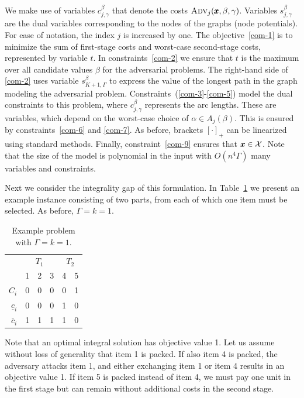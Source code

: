 We make use of variables $c^\beta_{j,\gamma}$ that denote the costs $\textsc{Adv}_j(\pmb{x},\beta,\gamma)$. Variables $s^\beta_{j,\gamma}$ are the dual variables corresponding to the nodes of the graphs (node potentials). For ease of notation, the index $j$ is increased by one.
The objective~\eqref{com-1} is to minimize the sum of first-stage costs and worst-case second-stage costs, represented by variable $t$. In constraints~\eqref{com-2} we ensure that $t$ is the maximum over all candidate values $\beta$ for the adversarial problems. The right-hand side of \eqref{com-2} uses variable $s^\beta_{K+1,\Gamma}$ to express the value of the longest path in the graph modeling the adversarial problem. Constraints~(\ref{com-3}-\ref{com-5}) model the dual constraints to this problem, where $c^\beta_{j,\gamma}$ represents the arc lengths. These are variables, which depend on the worst-case choice of $\alpha\in A_j(\beta)$. This is ensured by constraints~\eqref{com-6} and \eqref{com-7}. As before, brackets $[\cdot]_+$ can be linearized using standard methods. Finally, constraint~\eqref{com-9} ensures that $\pmb{x}\in\mathcal{X}$. Note that the size of the model is polynomial in the input with $O(n^4\Gamma)$ many variables and constraints.

Next we consider the integrality gap of this formulation. In Table~\ref{tab:example2} we present an example instance consisting of two parts, from each of which one item must be selected. As before, $\Gamma=k=1$.
\begin{table}[htb]
\begin{center}
\begin{tabular}{r|rrr|rr}
 & \multicolumn{3}{c|}{$T_1$} & \multicolumn{2}{c}{$T_2$} \\
 & 1 & 2 & 3 & 4 & 5 \\
 \hline
$C_i$ & 0 & 0 & 0 & 0 & 1\\
$\underline{c}_i$ & 0 & 0 & 0 & 1 & 0 \\
$\overline{c}_i$ & 1 & 1 & 1 & 1 & 0
\end{tabular}
\end{center}
\caption{Example problem with $\Gamma=k=1$.\label{tab:example2}}
\end{table}
Note that an optimal integral solution has objective value 1. Let us assume without loss of generality that item 1 is packed. If also item 4 is packed, the adversary attacks item 1, and either exchanging item 1 or item 4 results in an objective value 1. If item 5 is packed instead of item 4, we must pay one unit in the first stage but can remain without additional costs in the second stage.

